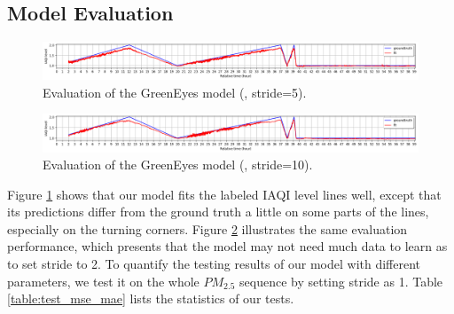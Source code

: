 \documentclass[sigconf]{acmart}
\begin{document}
\subsection{Model Evaluation}

\begin{figure}[!htbp]
    \centering
    \includegraphics[width=\linewidth]{fig/results/evaluation/model_eval_pm25_3_stride_5.png}
    \caption{Evaluation of the GreenEyes model (, stride=5).}
    \label{fig:model_eval_pm25_3_stride_5}
\end{figure}

\begin{figure}[!htbp]
    \centering
    \includegraphics[width=\linewidth]{fig/results/evaluation/model_eval_pm25_3_stride_2.png}
    \caption{Evaluation of the GreenEyes model (, stride=10).}
    \label{fig:model_eval_pm25_3_stride_2}
\end{figure}

Figure \ref{fig:model_eval_pm25_3_stride_5} shows that our model fits the labeled IAQI level lines well, except that its predictions differ from the ground truth a little on some parts of the lines, especially on the turning corners. Figure \ref{fig:model_eval_pm25_3_stride_2} illustrates the same evaluation performance, which presents that the model may not need much data to learn as to set stride to 2.
To quantify the testing results of our model with different parameters, we test it on the whole $PM_{2.5}$ sequence by setting stride as 1. Table \ref{table:test_mse_mae} lists the statistics of our tests.

\end{document}
